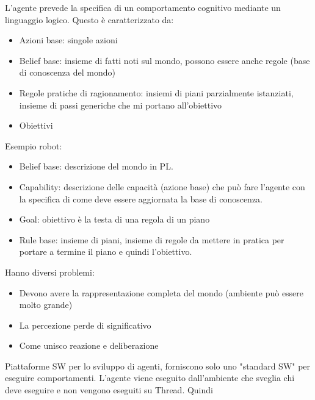 \begin{esempio}
    L'agente prevede la specifica di un comportamento cognitivo mediante un
    linguaggio logico. Questo è caratterizzato da:
    \begin{itemize}
        \item Azioni base: singole azioni
        \item Belief base: insieme di fatti noti sul mondo, possono essere anche
              regole (base di conoscenza del mondo)
        \item Regole pratiche di ragionamento: insiemi di piani parzialmente istanziati,
              insieme di passi generiche che mi portano all'obiettivo
        \item Obiettivi
    \end{itemize}
    Esempio robot:
    \begin{itemize}
        \item Belief base: descrizione del mondo in PL.
        \item Capability: descrizione delle capacità (azione base) che può fare
              l'agente con la specifica di come deve essere aggiornata la base
              di conoscenza.
        \item Goal: obiettivo è la testa di una regola di un piano
        \item Rule base: insieme di piani, insieme di regole da mettere in pratica
              per portare a termine il piano e quindi l'obiettivo.
    \end{itemize}

    Hanno diversi problemi:
    \begin{itemize}
        \item Devono avere la rappresentazione completa del mondo (ambiente può
              essere molto grande)
        \item La percezione perde di significativo
        \item Come unisco reazione e deliberazione
    \end{itemize}
\end{esempio}
\begin{esempio} 
    Piattaforme SW per lo sviluppo di agenti, forniscono solo uno "standard SW"
    per eseguire comportamenti. L'agente viene eseguito dall'ambiente che sveglia
    chi deve eseguire e non vengono eseguiti su Thread. Quindi
\end{esempio}


